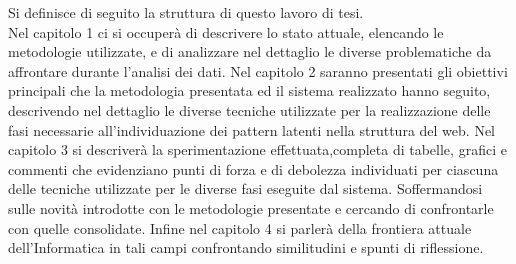 Si definisce di seguito la struttura di questo lavoro di tesi.\\
Nel capitolo 1 ci si occuperà di descrivere lo stato attuale, elencando le metodologie utilizzate, e di analizzare nel dettaglio le diverse problematiche da affrontare durante l'analisi dei dati.
Nel capitolo 2 saranno presentati gli obiettivi principali che la metodologia presentata ed il sistema realizzato hanno seguito, descrivendo nel dettaglio le diverse tecniche utilizzate per la realizzazione delle fasi necessarie all'individuazione dei pattern latenti nella struttura del web.
Nel capitolo 3 si descriverà la sperimentazione effettuata,completa di tabelle, grafici e commenti che evidenziano punti di forza e di debolezza individuati per ciascuna delle tecniche utilizzate per le diverse fasi eseguite dal sistema. Soffermandosi sulle novità introdotte con le metodologie presentate e cercando di confrontarle con quelle consolidate.
Infine nel capitolo 4 si parlerà della frontiera attuale dell'Informatica in tali campi confrontando similitudini e spunti di riflessione.


